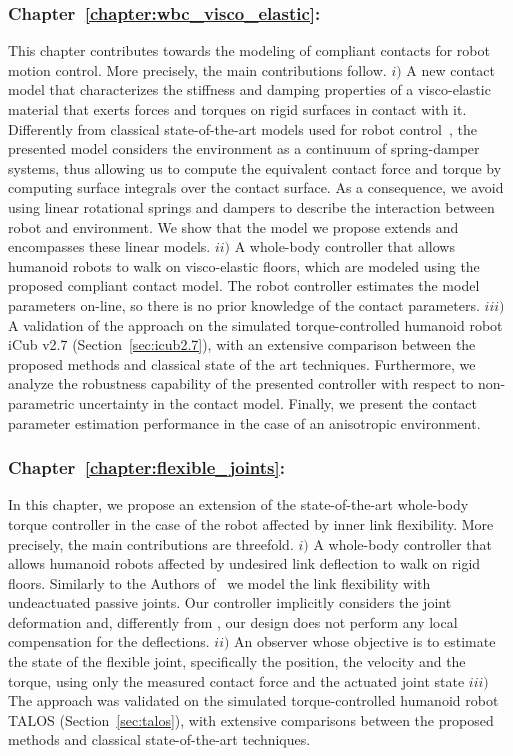 \subsubsection{Chapter~\ref{chapter:wbc_visco_elastic}: }
This chapter contributes towards the modeling of compliant contacts for robot motion control. More precisely, the main contributions follow. $i)$ A new contact model that characterizes the stiffness and damping properties of a visco-elastic material that exerts forces and torques on rigid surfaces in contact with it. Differently from classical state-of-the-art models used for robot control~\citep{Li2019,Flayols2020,Fahmi2020STANCE:Terrain}, 
the presented model considers the environment as a continuum of spring-damper systems, thus allowing us to compute the equivalent contact force and torque by computing surface integrals over the contact surface. As a consequence, we avoid using linear rotational springs and dampers to describe the interaction between robot and environment. We show that the model we propose extends and encompasses these linear models. $ii)$ A whole-body controller that allows humanoid robots to walk on visco-elastic floors, which are modeled using the proposed compliant contact model. The robot controller estimates the model parameters on-line, so there is no prior knowledge of the contact parameters. $iii)$ A validation of the approach on the simulated torque-controlled humanoid robot iCub v2.7 (Section~\ref{sec:icub2.7}), with an extensive comparison between the proposed methods and classical state of the art techniques.  
Furthermore, we analyze the robustness capability of the presented controller with respect to non-parametric uncertainty in the contact model.
Finally, we present the contact parameter estimation performance in the case of an anisotropic environment.

\subsubsection{Chapter~\ref{chapter:flexible_joints}: }
In this chapter, we propose an extension of the state-of-the-art whole-body torque controller in the case of the robot affected by inner link flexibility. More precisely, the main contributions are threefold. $i)$ A whole-body controller that allows humanoid robots affected by undesired link deflection to walk on rigid floors. Similarly to the Authors of~\citep{Villa2022TorqueFlexibility} we model the link flexibility with undeactuated passive joints. Our controller implicitly considers the joint deformation and, differently from \citep{Villa2022TorqueFlexibility}, our design does not perform any local compensation for the deflections.
$ii)$ An observer whose objective is to estimate the state of the flexible joint, specifically the position, the velocity and the torque, using only the measured contact force and the actuated joint state
$iii)$ The approach was validated on the simulated torque-controlled humanoid robot TALOS (Section~\ref{sec:talos}), with extensive comparisons between the proposed methods and classical state-of-the-art techniques.

